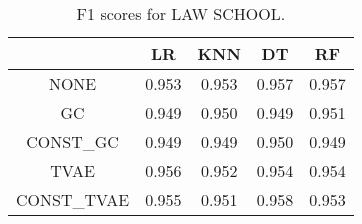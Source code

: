 \begin{table}
\caption{F1 scores for LAW SCHOOL.}
\label{tab:f1-LAW SCHOOL}
\begin{tabular}{ccccc}
\toprule
 & LR & KNN & DT & RF \\
\midrule
NONE & 0.953 & 0.953 & 0.957 & 0.957 \\
GC & 0.949 & 0.950 & 0.949 & 0.951 \\
CONST\_GC & 0.949 & 0.949 & 0.950 & 0.949 \\
TVAE & 0.956 & 0.952 & 0.954 & 0.954 \\
CONST\_TVAE & 0.955 & 0.951 & 0.958 & 0.953 \\
\bottomrule
\end{tabular}
\end{table}
